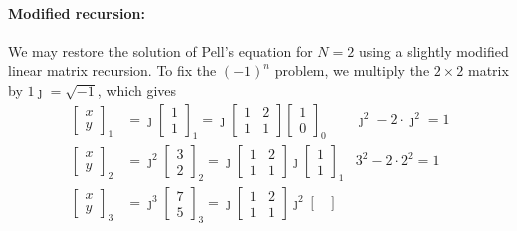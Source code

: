 \documentclass{ximera}
\begin{document}
\paragraph{Modified recursion:} %
We may restore the solution of Pell's equation for $N=2$ using a slightly modified
linear matrix recursion.  To fix the $(-1)^n$ problem, we multiply the $2\times 2$ matrix by
$1\jmath=\sqrt{-1}$, which gives
	\begin{align*}
\begin{bmatrix}
x \\ y
\end{bmatrix}_1
&=
\jmath
\begin{bmatrix}
1 \\ 1
\end{bmatrix}_1
 =
\jmath
\begin{bmatrix}
1 & 2 \\
1 & 1
\end{bmatrix}
\begin{bmatrix}
1\\0 
\end{bmatrix}_0
&  \jmath^2 -2\cdot{\jmath}^2 = 1
\\
\begin{bmatrix}
x \\ y
\end{bmatrix}_2
&=
\jmath^2
\begin{bmatrix}
3\\2
\end{bmatrix}_2
 =
\jmath
\begin{bmatrix}
1 & 2 \\
1 & 1
\end{bmatrix}
\jmath
\begin{bmatrix}
1\\1
\end{bmatrix}_1
&  3^2 -2\cdot{2}^2 = 1
\\
\begin{bmatrix}
x \\ y
\end{bmatrix}_3
&=
\jmath^3
\begin{bmatrix}
7\\5
\end{bmatrix}_3
 =
\jmath
\begin{bmatrix}
1 & 2 \\
1 & 1
\end{bmatrix}
\jmath^2
\begin{bmatrix}

\end{bmatrix}
\end{align*}
\end{document}
